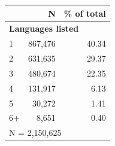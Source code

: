\begin{tabular}{lrr}


\toprule


 & N & \% of total \\


\midrule


\multicolumn{3}{l}{\textbf{Languages listed}}\\ 
\midrule
1                   &     867,476&       40.34\\
2                   &     631,635&       29.37\\
3                   &     480,674&       22.35\\
4                   &     131,917&        6.13\\
5                   &      30,272&        1.41\\
6+                  &       8,651&        0.40\\
\midrule


\multicolumn{3}{l}{\footnotesize N =    2,150,625}\\


\bottomrule


\end{tabular}



